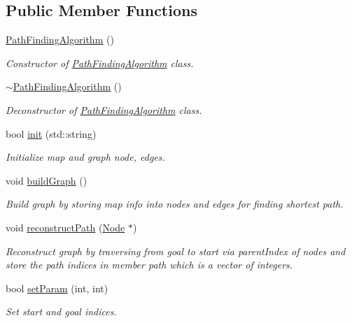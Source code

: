 \subsection*{Public Member Functions}
\begin{DoxyCompactItemize}
\item 
\hyperlink{classPathFindingAlgorithm_ad9af1fa0b8bb6dc6660219c0b21a3749}{Path\-Finding\-Algorithm} ()
\begin{DoxyCompactList}\small\item\em Constructor of \hyperlink{classPathFindingAlgorithm}{Path\-Finding\-Algorithm} class. \end{DoxyCompactList}\item 
\hyperlink{classPathFindingAlgorithm_a68fdd88d9348febf0e1814af9add5ca3}{$\sim$\-Path\-Finding\-Algorithm} ()
\begin{DoxyCompactList}\small\item\em Deconstructor of \hyperlink{classPathFindingAlgorithm}{Path\-Finding\-Algorithm} class. \end{DoxyCompactList}\item 
bool \hyperlink{classPathFindingAlgorithm_a02dabb2f15ac242896b502d0eedf5537}{init} (std\-::string)
\begin{DoxyCompactList}\small\item\em Initialize map and graph node, edges. \end{DoxyCompactList}\item 
void \hyperlink{classPathFindingAlgorithm_a71b876665f35f458137ff9f2347fcc54}{build\-Graph} ()
\begin{DoxyCompactList}\small\item\em Build graph by storing map info into nodes and edges for finding shortest path. \end{DoxyCompactList}\item 
void \hyperlink{classPathFindingAlgorithm_a334c5cfc5b40a1e8458eb960ff5f541c}{reconstruct\-Path} (\hyperlink{classNode}{Node} $\ast$)
\begin{DoxyCompactList}\small\item\em Reconstruct graph by traversing from goal to start via parent\-Index of nodes and store the path indices in member path which is a vector of integers. \end{DoxyCompactList}\item 
bool \hyperlink{classPathFindingAlgorithm_a2b48e12615aecc6fd952efcb5d920864}{set\-Param} (int, int)
\begin{DoxyCompactList}\small\item\em Set start and goal indices. \end{DoxyCompactList}\item 

\end{DoxyCompactItemize}
